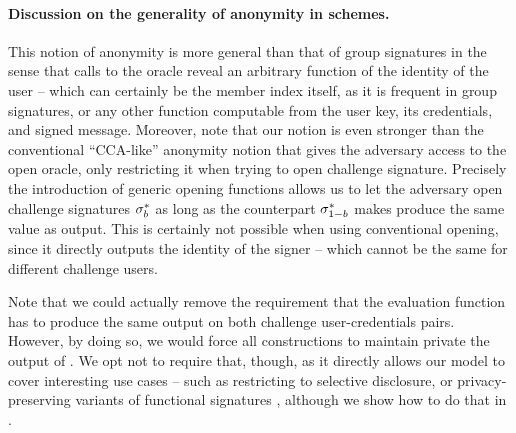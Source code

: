 \paragraph{Discussion on the generality of anonymity in \UAS schemes.} %
This notion of anonymity is more general than that of group signatures in the
sense that calls to the \OPEN oracle reveal an arbitrary function of the
identity of the user -- which can certainly be the member index itself, as it
is frequent in group signatures, or any other function computable from the
user key, its credentials, and signed message. Moreover, note that
our notion is even stronger than the conventional ``CCA-like'' anonymity notion
that gives the adversary access to the open oracle, only restricting it when
trying to open challenge signature. Precisely the introduction of generic
opening functions allows us to let the adversary open challenge signatures
$\mathsf{\sigma}^*_b$ as long as the counterpart $\mathsf{\sigma}^*_{1-b}$
makes \Open produce the same \y value as output. This is certainly not
possible when using conventional opening, since it directly outputs the identity
of the signer -- which cannot be the same for different challenge users.

Note that we could actually remove the requirement that the evaluation function
has to produce the same output on both challenge user-credentials pairs.
However, by doing so, we would force all constructions to maintain private the
output of \feval. We opt not to require that, though, as it directly allows
our model to cover interesting use cases -- such as restricting to selective
disclosure, or privacy-preserving variants of functional signatures , although we show how to do that in .
\fi

